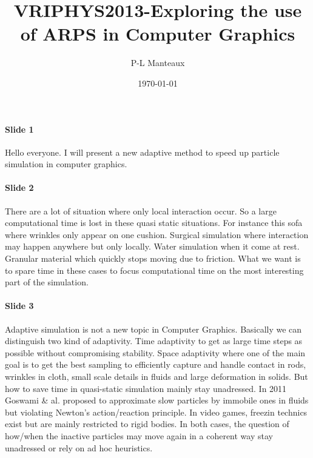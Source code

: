 \documentclass[twocolumn]{article}
\title{VRIPHYS2013-Exploring the use of ARPS in Computer Graphics}
\author{P-L Manteaux}
\date{\today}
\begin{document}
\twocolumn[{
\maketitle %
\begin{center}
\centering
\end{center}
\centering
\begin{onecolabstract}
\end{onecolabstract}
}]
\paragraph{Slide 1}
Hello everyone. I will present a new adaptive method to speed up particle simulation in computer graphics.
\paragraph{Slide 2}
There are a lot of situation where only local interaction occur.
So a large computational time is lost in these quasi static situations.
For instance this sofa where wrinkles only appear on one cushion.
Surgical simulation where interaction may happen anywhere but only locally.
Water simulation when it come at rest.
Granular material which quickly stops moving due to friction.
What we want is to spare time in these cases to focus computational time on the most interesting part of the simulation.
\paragraph{Slide 3}
Adaptive simulation is not a new topic in Computer Graphics. 
Basically we can distinguish two kind of adaptivity. 
Time adaptivity to get as large time steps as possible without compromising stability.
Space adaptivity where one of the main goal is to get the best sampling to efficiently capture and handle
contact in rods, wrinkles in cloth, small scale details in fluids and large deformation in solids.
But how to save time in quasi-static simulation mainly stay unadressed. 
In 2011 Goswami \& al. proposed to approximate slow particles by immobile ones in fluids but violating Newton's action/reaction principle. 
In video games, freezin technics exist but are mainly restricted to rigid bodies.
In both cases, the question of how/when the inactive particles may move again in a coherent way stay unadressed or rely on ad hoc heuristics.
\end{document}
